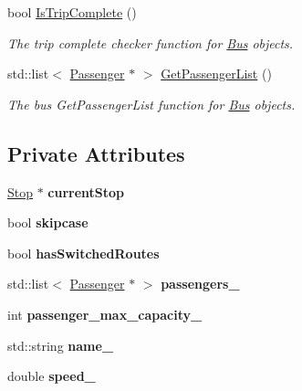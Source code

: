 \begin{figure}[H]
\begin{center}
\begin{DoxyCompactItemize}
bool \hyperlink{classBus_a9c64b0801bf589f121fb0598b70a99b4}{Is\+Trip\+Complete} ()
\begin{DoxyCompactList}\small\item\em The trip complete checker function for \hyperlink{classBus}{Bus} objects. \end{DoxyCompactList}\item 
std\+::list$<$ \hyperlink{classPassenger}{Passenger} $\ast$ $>$ \hyperlink{classBus_a0662511d51f1c4ba7466e626be3c2ca0}{Get\+Passenger\+List} ()
\begin{DoxyCompactList}\small\item\em The bus Get\+Passenger\+List function for \hyperlink{classBus}{Bus} objects. \end{DoxyCompactList}\end{DoxyCompactItemize}
\subsection*{Private Attributes}
\begin{DoxyCompactItemize}
\item 
\mbox{\label{classBus_a71d4efb1f0e2810c712d2b04eaa9f909}} 
\hyperlink{classStop}{Stop} $\ast$ {\bfseries current\+Stop}
\item 
\mbox{\label{classBus_aca3e8ae5c42858f0f9e59c53270ee04e}} 
bool {\bfseries skipcase}
\item 
\mbox{\label{classBus_a1e9e0ddf70d42b3320669f275a586587}} 
bool {\bfseries has\+Switched\+Routes}
\item 
\mbox{\label{classBus_a4a6e51d12fa70cbf9e973e82090773f3}} 
std\+::list$<$ \hyperlink{classPassenger}{Passenger} $\ast$ $>$ {\bfseries passengers\+\_\+}
\item 
\mbox{\label{classBus_a0f8a0586923d96c085a6d33b74150962}} 
int {\bfseries passenger\+\_\+max\+\_\+capacity\+\_\+}
\item 
\mbox{\label{classBus_a414fa2321dd325141c60741eb838972d}} 
std\+::string {\bfseries name\+\_\+}
\item 
\mbox{\label{classBus_acae5a7639b0c5b3c4a1d1f888ac18ce1}} 
double {\bfseries speed\+\_\+}
\item 

\end{DoxyCompactItemize}
\end{center}
\end{figure}

